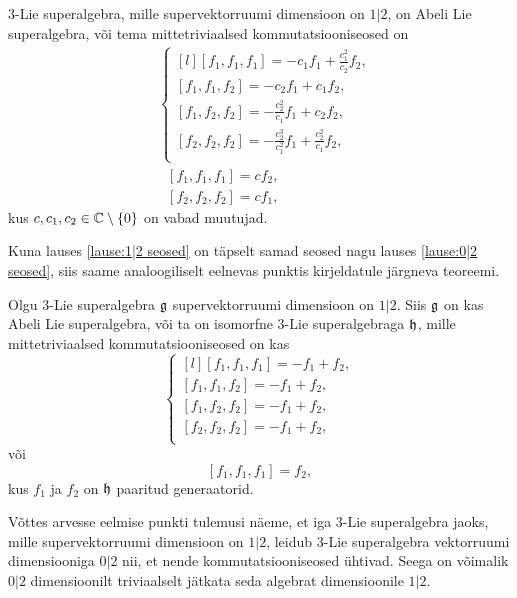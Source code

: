 \begin{lau} \label{lause:1|2 seosed}
    $3$-Lie superalgebra, mille supervektorruumi dimensioon on $1|2$, on Abeli
    Lie superalgebra, või tema mittetriviaalsed kommutatsiooniseosed on
    \renewcommand\arraystretch{1.2}
    \begin{align}
        & \left\{
            \begin{matrix*}[l]
                [f_1, f_1, f_1] = -c_1 f_1 + \frac{c_1^2}{c_2} f_2, \\
                [f_1, f_1, f_2] = -c_2 f_1 + c_1 f_2, \\
                [f_1, f_2, f_2] = -\frac{c_2^2}{c_1} f_1 + c_2 f_2, \\
                [f_2, f_2, f_2] = -\frac{c_2^3}{c_1^2} f_1 +
                    \frac{c_2^2}{c_1} f_2, \\
            \end{matrix*}
        \right. \\[0.2cm]
        &\ \ \ [f_1, f_1, f_1] = c f_2, \\[0.2cm]
        &\ \ \ [f_2, f_2, f_2] = c f_1,
    \end{align}
    \renewcommand\arraystretch{1}
    kus $c, c_1, c_2 \in \mathbb{C} \setminus \{ 0 \}$ on vabad muutujad.
\end{lau}

Kuna lauses \ref{lause:1|2 seosed} on täpselt samad seosed nagu lauses
\ref{lause:0|2 seosed}, siis saame analoogiliselt eelnevas punktis kirjeldatule
järgneva teoreemi.

\begin{thm}
    Olgu $3$-Lie superalgebra $\mathfrak{g}$ supervektorruumi dimensioon on $1|2$.
    Siis $\mathfrak{g}$ on kas Abeli Lie superalgebra, või ta on isomorfne $3$-Lie
    superalgebraga $\mathfrak{h}$, mille mittetriviaalsed kommutatsiooniseosed on kas
    \[ \left\{
            \begin{matrix*}[l]
                [f_1, f_1, f_1] = -f_1 + f_2, \\
                [f_1, f_1, f_2] = -f_1 + f_2, \\
                [f_1, f_2, f_2] = -f_1 + f_2, \\
                [f_2, f_2, f_2] = -f_1 + f_2, \\
            \end{matrix*}
    \right. \]
    või
    \[ [f_1, f_1, f_1]  = f_2, \]
    kus $f_1$ ja $f_2$ on $\mathfrak{h}$ paaritud generaatorid.
\end{thm}

Võttes arvesse eelmise punkti tulemusi näeme, et iga $3$-Lie superalgebra
jaoks, mille supervektorruumi dimensioon on $1|2$, leidub
$3$-Lie superalgebra vektorruumi dimensiooniga $0|2$ nii, et nende
kommutatsiooniseosed ühtivad. Seega on võimalik $0|2$ dimensioonilt
triviaalselt jätkata seda algebrat dimensioonile $1|2$.
